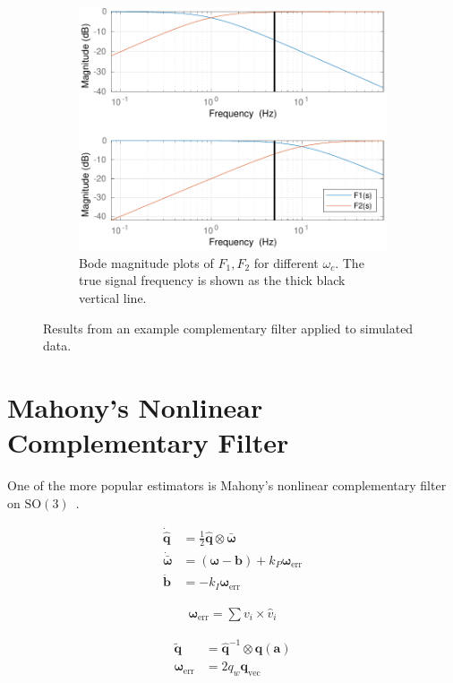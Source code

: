\documentclass[a4paper]{article}
\begin{document}
\begin{figure}[h]
  \begin{subfigure}[t]{0.32\textwidth}
    \includegraphics[width=\textwidth]{scf_bode.pdf}
    \caption{Bode magnitude plots of $F_1, F_2$ for different $\omega_c$. The true signal frequency is shown as the thick black vertical line.}
    \label{fig:scf_bode}
  \end{subfigure}
  \caption{Results from an example complementary filter applied to simulated data.}
  \label{fig:scf}
\end{figure}

\section*{Mahony's Nonlinear Complementary Filter}
One of the more popular estimators is Mahony's nonlinear complementary filter on $\mathrm{SO}(3)$~\cite{Mahony2008}.

\begin{align}
  \dot{\bm{\hat{q}}} &= \frac{1}{2} \hat{\bm q} \otimes \bm{\bar \omega} \\
  \dot{\bm{\bar \omega}} &= (\bm{\omega} - \bm{b}) + k_P\bm{\omega}_\text{err} \\
  \dot{\bm{b}} &= -k_I\bm{\omega}_\text{err}
\end{align}

\begin{align}
  \bm{\omega}_\text{err} = \sum v_i \times \hat{v}_i
\end{align}

\begin{align}
  \tilde{\bm{q}} &= \hat{\bm q}^{-1} \otimes \bm{q}(\bm{a}) \\
  \bm{\omega}_\text{err} &= 2 q_w \bm{q}_\text{vec}
\end{align}



\end{document}

